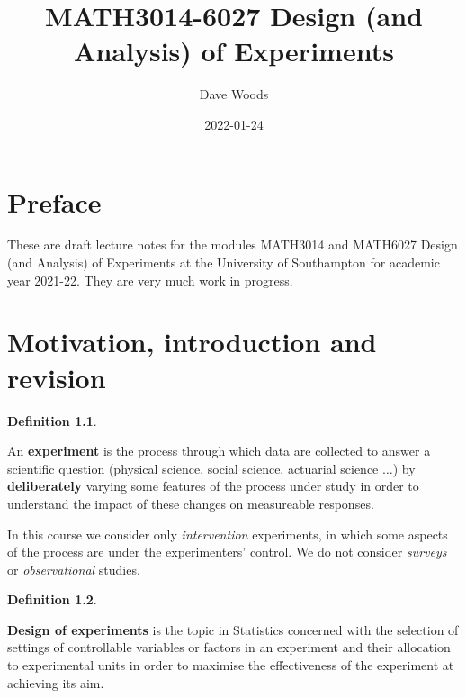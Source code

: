 \documentclass[
]{book}
\title{MATH3014-6027 Design (and Analysis) of Experiments}
\author{Dave Woods}
\date{2022-01-24}
\theoremstyle{definition}
\newtheorem{definition}{Definition}[chapter]
\theoremstyle{definition}
\theoremstyle{definition}
\theoremstyle{definition}
\theoremstyle{remark}
\begin{document}
\maketitle

{
\setcounter{tocdepth}{1}
\tableofcontents
}
\hypertarget{preface}{%
\chapter*{Preface}\label{preface}}

These are draft lecture notes for the modules MATH3014 and MATH6027 Design (and Analysis) of Experiments at the University of Southampton for academic year 2021-22. They are very much work in progress.

\newcommand{\bx}{\boldsymbol{x}}
\newcommand{\btheta}{\boldsymbol{\theta}}
\newcommand{\bbeta}{\boldsymbol{\beta}}
\newcommand{\bvarepsilon}{\boldsymbol{\varepsilon}}
\newcommand{\by}{\boldsymbol{y}}
\newcommand{\rT}{\mathrm{T}}
\newcommand{\Var}{\operatorname{Var}}
\newcommand{\bY}{\boldsymbol{Y}}

\hypertarget{intro}{%
\chapter{Motivation, introduction and revision}\label{intro}}

\begin{definition}
\protect\hypertarget{def:exp}{}\label{def:exp}

An \textbf{experiment} is the process through which data are collected to answer a scientific question (physical science, social science, actuarial science \(\dots\)) by \textbf{deliberately} varying some features of the process under study in order to understand the impact of these changes on measureable responses.

In this course we consider only \emph{intervention} experiments, in which some aspects of the process are under the experimenters' control. We do not consider \emph{surveys} or \emph{observational} studies.

\end{definition}

\begin{definition}
\protect\hypertarget{def:design}{}\label{def:design}

\textbf{Design of experiments} is the topic in Statistics concerned with the selection of settings of controllable variables or factors in an experiment and their allocation to experimental units in order to maximise the effectiveness of the experiment at achieving its aim.

\end{definition}
\end{document}
